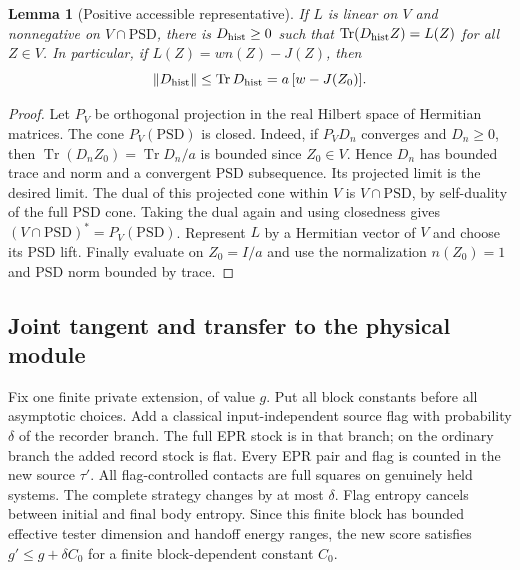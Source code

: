 \documentclass[11pt]{article}
\newtheorem{lemma}[theorem]{Lemma}
\theoremstyle{definition}
\theoremstyle{remark}
\newcommand{\Tr}{\operatorname{Tr}}
\begin{document}
\begin{lemma}[Positive accessible representative]\label{sc-lem:dual}
If $L$ is linear on $V$ and nonnegative on $V\cap\mathrm{PSD}$, there is $D_{\rm hist}\ge0$ such that $\Tr(D_{\rm hist}Z)=L(Z)$ for all $Z\in V$. In particular, if $L(Z)=w n(Z)-J(Z)$, then
\[
\|D_{\rm hist}\|\le\Tr D_{\rm hist}=a\,[w-J(Z_0)].
\]
\end{lemma}
\begin{proof}
Let $P_V$ be orthogonal projection in the real Hilbert space of Hermitian matrices. The cone $P_V(\mathrm{PSD})$ is closed. Indeed, if $P_VD_n$ converges and $D_n\ge0$, then $\Tr(D_nZ_0)=\Tr D_n/a$ is bounded since $Z_0\in V$. Hence $D_n$ has bounded trace and norm and a convergent PSD subsequence. Its projected limit is the desired limit. The dual of this projected cone within $V$ is $V\cap\mathrm{PSD}$, by self-duality of the full PSD cone. Taking the dual again and using closedness gives $(V\cap\mathrm{PSD})^*=P_V(\mathrm{PSD})$. Represent $L$ by a Hermitian vector of $V$ and choose its PSD lift. Finally evaluate on $Z_0=I/a$ and use the normalization $n(Z_0)=1$ and PSD norm bounded by trace.
\end{proof}

\subsection{Joint tangent and transfer to the physical module}
Fix one finite private extension, of value $g$. Put all block constants before all asymptotic choices. Add a classical input-independent source flag with probability $\delta$ of the recorder branch. The full EPR stock is in that branch; on the ordinary branch the added record stock is flat. Every EPR pair and flag is counted in the new source $\tau'$. All flag-controlled contacts are full squares on genuinely held systems. The complete strategy changes by at most $\delta$. Flag entropy cancels between initial and final body entropy. Since this finite block has bounded effective tester dimension and handoff energy ranges, the new score satisfies $g'\le g+\delta C_0$ for a finite block-dependent constant $C_0$.
\end{document}
